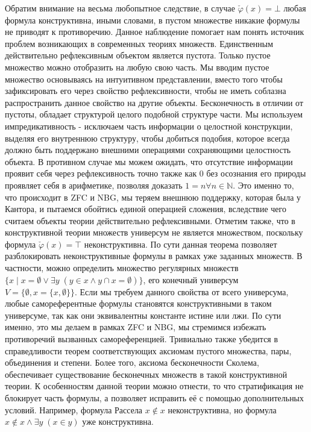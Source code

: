 \documentclass[12pt]{article}
\begin{document}
Обратим внимание на весьма любопытное следствие, в случае $\check{\varphi}(x) = \bot$ любая формула конструктивна, иными словами, в пустом множестве никакие формулы не приводят к противоречию. Данное наблюдение помогает нам понять источник проблем возникающих в современных теориях множеств. Единственным действительно рефлексивным объектом является пустота. Только пустое множество можно отобразить на любую свою часть. Мы вводим пустое множество основываясь на интуитивном представлении, вместо того чтобы зафиксировать его через свойство рефлексивности, чтобы не иметь соблазна распространить данное свойство на другие объекты. Бесконечность в отличии от пустоты, обладает структурой целого подобной структуре части. Мы используем импредикативность - исключаем часть информации о целостной конструкции, выделяя его внутреннюю структуру, чтобы добиться подобия, которое всегда должно быть поддержано внешними операциями сохраняющими целостность объекта. В противном случае мы можем ожидать, что отсутствие информации проявит себя через рефлексивность точно также как $0$ без осознания его природы проявляет себя в арифметике, позволяя доказать $1 = n \forall n \in \mathbb{N}$. Это именно то, что происходит в ZFC и NBG, мы теряем внешнюю поддержку, которая была у Кантора, и пытаемся обойтись единой операцией сложения, вследствие чего считаем объекты теории действительно рефлексивными. Отметим также, что в конструктивной теории множеств универсум не является множеством, поскольку формула $\check{\varphi}(x) = \top$ неконструктивна. По сути данная теорема позволяет разблокировать неконструктивные формулы в рамках уже заданных множеств. В частности, можно определить множество регулярных множеств $\{ x \mid x = \emptyset \vee \exists y \; (y \in x \wedge y \cap x = \emptyset) \}$, его конечный универсум $V = \{ \emptyset, x = \{ x, \emptyset \} \}$. Если мы требуем данного свойства от всего универсума, любые самореферентные формулы становятся конструктивными в таком универсуме, так как они эквивалентны константе истине или лжи. По сути именно, это мы делаем в рамках ZFC и NBG, мы стремимся избежать противоречий вызванных самореференцией. Тривиально также убедится в справедливости теорем соответствующих аксиомам пустого множества, пары, объединения и степени. Более того, аксиома бесконечности Сколема, обеспечивает существование бесконечных множеств в такой конструктивной теории. К особенностям данной теории можно отнести, то что стратификация не блокирует часть формулы, а позволяет исправить её с помощью дополнительных условий. Например, формула Рассела $x \notin x$ неконструктивна, но формула $x \notin x \wedge \exists y \; (x \in y)$ уже конструктивна. 
\end{document}
